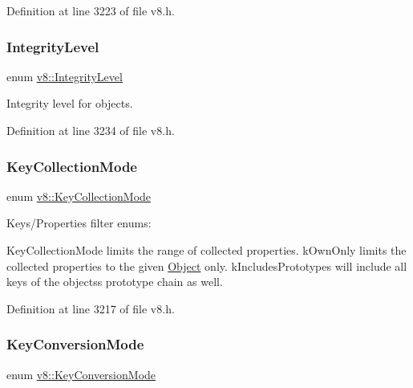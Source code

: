 Definition at line 3223 of file v8.\+h.

\mbox{\label{namespacev8_a02642d03ff1eecc2fd358626499c2e30}} 
\subsubsection{\texorpdfstring{Integrity\+Level}{IntegrityLevel}}
{\footnotesize\ttfamily enum \mbox{\hyperlink{namespacev8_a02642d03ff1eecc2fd358626499c2e30}{v8\+::\+Integrity\+Level}}\hspace{0.3cm}{\ttfamily [strong]}}

Integrity level for objects. 

Definition at line 3234 of file v8.\+h.

\mbox{\label{namespacev8_a0cee20f5c7f0d59d0835af8e537388dc}} 
\subsubsection{\texorpdfstring{Key\+Collection\+Mode}{KeyCollectionMode}}
{\footnotesize\ttfamily enum \mbox{\hyperlink{namespacev8_a0cee20f5c7f0d59d0835af8e537388dc}{v8\+::\+Key\+Collection\+Mode}}\hspace{0.3cm}{\ttfamily [strong]}}

Keys/\+Properties filter enums\+:

Key\+Collection\+Mode limits the range of collected properties. k\+Own\+Only limits the collected properties to the given \mbox{\hyperlink{classv8_1_1Object}{Object}} only. k\+Includes\+Prototypes will include all keys of the objects\textquotesingle{}s prototype chain as well. 

Definition at line 3217 of file v8.\+h.

\mbox{\label{namespacev8_aa65aeff871614520d8033dead4b34e38}} 
\subsubsection{\texorpdfstring{Key\+Conversion\+Mode}{KeyConversionMode}}
{\footnotesize\ttfamily enum \mbox{\hyperlink{namespacev8_aa65aeff871614520d8033dead4b34e38}{v8\+::\+Key\+Conversion\+Mode}}\hspace{0.3cm}{\ttfamily [strong]}}

